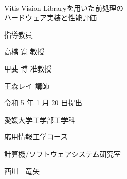 \documentclass[11pt,a4j]{jreport}
\begin{document}
\thispagestyle{empty}
\begin{center}
\
\vspace{3cm}

{\huge{Vitis Vision Libraryを用いた前処理の\\
ハードウェア実装と性能評価}}

\vspace{9mm}

{\LARGE 指導教員}

\vspace{5mm}

{\LARGE 高橋 寛 教授}

\vspace{4mm}

{\LARGE 甲斐 博 准教授}

\vspace{4mm}

{\LARGE 王森レイ 講師}

\vspace{20mm}

{\LARGE 令和 5 年 1 月 20 日提出}\\

\vspace{20mm}

{\LARGE 愛媛大学工学部工学科}\\

\vspace{4mm}

{\LARGE 応用情報工学コース}\\

\vspace{4mm}

{\LARGE 計算機/ソフトウェアシステム研究室}\\

\vspace{18mm}

{\huge 西川　竜矢}\\

\end{center}

\thispagestyle{empty}
\clearpage

\tableofcontents

\pagestyle{fancy}
\lhead{\rightmark}
\renewcommand{\chaptermark}[1]{\markboth{第\ \normalfont\thechapter\ 章~~#1}{}}
%
\end{document}
